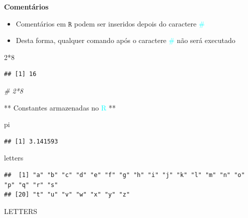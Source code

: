 \documentclass[
]{book}
\newenvironment{Shaded}{\begin{snugshade}}{\end{snugshade}}
\newcommand{\CommentTok}[1]{\textcolor[rgb]{0.56,0.35,0.01}{\textit{#1}}}
\newcommand{\DecValTok}[1]{\textcolor[rgb]{0.00,0.00,0.81}{#1}}
\newcommand{\NormalTok}[1]{#1}
\newcommand{\SpecialCharTok}[1]{\textcolor[rgb]{0.00,0.00,0.00}{#1}}
\providecommand{\tightlist}{%
  \setlength{\itemsep}{0pt}\setlength{\parskip}{0pt}}
\begin{document}
\textbf{Comentários}

\begin{itemize}
\tightlist
\item
  Comentários em \(\texttt{R}\) podem ser inseridos depois do caractere \textcolor{cyan}{$\texttt{\#}$}
\item
  Desta forma, qualquer comando após o caractere \textcolor{cyan}{$\texttt{\#}$} não será executado
\end{itemize}

\begin{Shaded}
\begin{Highlighting}[]
\DecValTok{2}\SpecialCharTok{*}\DecValTok{8}
\end{Highlighting}
\end{Shaded}

\begin{verbatim}
## [1] 16
\end{verbatim}

\begin{Shaded}
\begin{Highlighting}[]
\CommentTok{\# 2*8}
\end{Highlighting}
\end{Shaded}

** Constantes armazenadas no \textcolor{cyan}{R} **

\begin{Shaded}
\begin{Highlighting}[]
\NormalTok{pi}
\end{Highlighting}
\end{Shaded}

\begin{verbatim}
## [1] 3.141593
\end{verbatim}

\begin{Shaded}
\begin{Highlighting}[]
\NormalTok{letters}
\end{Highlighting}
\end{Shaded}

\tiny

\begin{verbatim}
##  [1] "a" "b" "c" "d" "e" "f" "g" "h" "i" "j" "k" "l" "m" "n" "o" "p" "q" "r" "s"
## [20] "t" "u" "v" "w" "x" "y" "z"
\end{verbatim}

\normalsize

\begin{Shaded}
\begin{Highlighting}[]
\NormalTok{LETTERS}
\end{Highlighting}
\end{Shaded}
\end{document}
